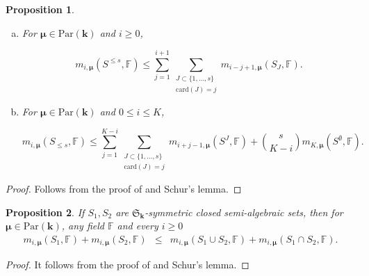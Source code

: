 \documentclass{amsart}
\newtheorem{proposition}{Proposition}
\theoremstyle{definition}
\theoremstyle{remark}
\numberwithin{equation}{section}
\begin{document}
\begin{proposition}
  \label{7:prop:prop1}{$\mbox{}$}
   \begin{enumerate}[(a)]
    \item 
    \label{7:prop:prop1:itema}
    For $\pmb{\mu} \in {\mathrm{Par}}({\mathbf{k}})$ and $i \geq 0$,
    
     \begin{equation*}
      m_{i,\pmb{\mu}} (S^{\le s} ,{\mathbb{F}}) \leq \sum_{j=1}^{i+1}
      \sum_{\substack{
        J \subset \{ 1, \ldots ,s \}\\
        {\mathrm{card}} (J) =j}} 
       m_{i-j+1,\pmb{\mu}} (S_{J} ,{\mathbb{F}}) .
    \end{equation*}
    
    \item 
    \label{7:prop:prop1:itemb}
    For $\pmb{\mu} \in {\mathrm{Par}}({\mathbf{k}})$ and $0 \le i \le K$,
    
     \begin{equation*}
      \label{7:eqn:prop1} m_{i,\pmb{\mu}} (S_{\le s} ,{\mathbb{F}}) \leq \sum_{j=1}^{K-i}
      \sum_{\substack{
        J \subset \{ 1, \ldots ,s \}\\
        {\mathrm{card}} (J) =j}}
      m_{i+j-1,\pmb{\mu}} (S^{J} ,{\mathbb{F}}) + \binom{s}{K-i} m_{K,\pmb{\mu}}
      (S^{\emptyset} ,{\mathbb{F}}) .
    \end{equation*}
  \end{enumerate}
\end{proposition}

\begin{proof} Follows from the proof of 
\cite[Proposition 7.33]{BPRbook2} and Schur's lemma.
\end{proof}

\begin{proposition}
  \label{prop:MV}
  If $S_{1} ,S_{2}$ are $\mathfrak{S}_{\mathbf{k}}$-symmetric  closed semi-algebraic sets, then for
  $\pmb{\mu} \in {\mathrm{Par}}({\mathbf{k}})$, any field ${\mathbb{F}}$ and every $i \geq 0$
  \begin{eqnarray*}
    m_{i,\pmb{\mu}} (S_{1} ,{\mathbb{F}}) +m_{i,\pmb{\mu}} (S_{2} ,{\mathbb{F}}) & \leq & m_{i,\pmb{\mu}}
    (S_{1} \cup S_{2} ,{\mathbb{F}}) + m_{i,\pmb{\mu}} (S_{1} \cap S_{2} ,{\mathbb{F}}).
    \end{eqnarray*}
\end{proposition}
\begin{proof}
It follows from the proof of 
\cite[Proposition 6.44]{BPRbook2} and Schur's lemma.
\end{proof}
\end{document}
